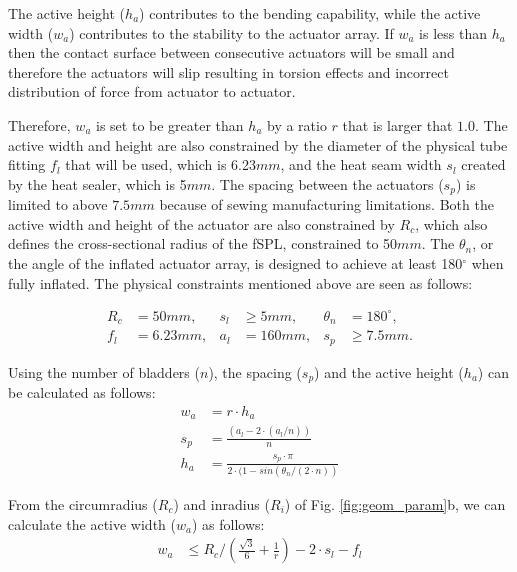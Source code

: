 \documentclass[letterpaper, 10 pt, conference]{ieeeconf}  %
\begin{document}
The active height ($h_{a}$) contributes to the bending capability, while the active width ($w_{a}$) contributes to the stability to the actuator array. If $w_{a}$ is less than $h_{a}$ then the contact surface between consecutive actuators will be small and therefore the actuators will slip resulting in torsion effects and incorrect distribution of force from actuator to actuator.

Therefore, $w_a$ is set to be greater than $h_a$ by a ratio $r$ that is larger that $1.0$. The active width and height are also constrained by the diameter of the physical tube fitting $f_l$ that will be used, which is 6.23$mm$, and the heat seam width $s_l$ created by the heat sealer, which is 5$mm$. The spacing between the actuators ($s_{p}$) is limited to above $7.5mm$ because of sewing manufacturing limitations. Both the active width and height of the actuator are also constrained by $R_{c}$, which also defines the cross-sectional radius of the fSPL, constrained to 50$mm$. The $\theta_{n}$, or the angle of the inflated  actuator array, is designed to achieve at least 180$^{\circ}$ when fully inflated. The physical constraints mentioned above are seen as follows:
% 
% 


\begin{align*}
R_c &= 50mm,    &  s_l &\geq 5mm,      &  \theta_n&=180^\circ,\\
f_l&=6.23mm,         &  a_l&=160mm,   &  s_p&\geq7.5mm.
\label{eq:constraints}
\end{align*}

Using the number of bladders ($n$), the spacing ($s_{p}$) and the active height ($h_{a}$) can be calculated as follows:
% 
% 
\begin{align} 
w_a &= r\cdot h_a \\
s_p &=  \frac{(a_{l} - 2\cdot(a_l/n))}{n} \\ 
h_a &=  \frac{s_p \cdot \pi}{2\cdot(1-sin(\theta_n/(2\cdot n))} \label{eq:wa_sp_ha}
\end{align}

From the circumradius ($R_c$) and inradius ($R_i$) of Fig. \ref{fig:geom_param}b, we can calculate the active width ($w_a$) as follows:
\begin{align} 
w_a &\leq  R_c/(\frac{\sqrt{3}}{6} + \frac{1}{r}) - 2\cdot s_l -f_l \label{eq:wa_ha}
\end{align}
\end{document}
